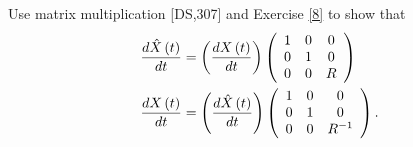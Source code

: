 \documentclass{ximera}
\begin{document}
\begin{exercise}
Use matrix multiplication [DS,307] and Exercise \ref{8} to show that%
\begin{align*}
\frac{d\hat{X}\left(  t\right)  }{dt}  &  =\left(  \frac{dX\left(  t\right)
}{dt}\right)  \left(
\begin{array}
[c]{ccc}%
1 & 0 & 0\\
0 & 1 & 0\\
0 & 0 & R
\end{array}
\right) \\
\frac{dX\left(  t\right)  }{dt}  &  =\left(  \frac{d\hat{X}\left(  t\right)
}{dt}\right)  \left(
\begin{array}
[c]{ccc}%
1 & 0 & 0\\
0 & 1 & 0\\
0 & 0 & R^{-1}%
\end{array}
\right)  .
\end{align*}

\end{exercise}
\end{document}
